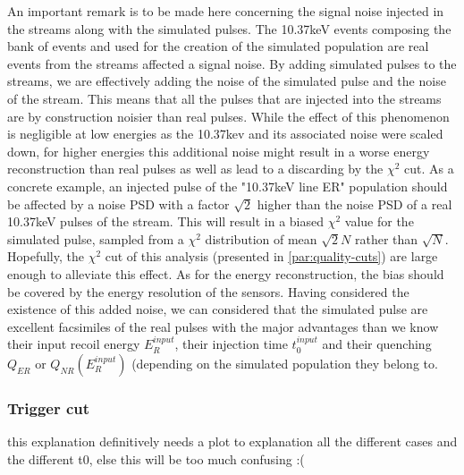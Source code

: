 An important remark is to be made here concerning the signal noise injected in the streams along with the simulated pulses. The 10.37keV events composing the bank of events and used for the creation of the simulated population are real events from the streams affected a signal noise. By adding simulated pulses to the streams, we are effectively adding the noise of the simulated pulse and the noise of the stream. This means that all the pulses that are injected into the streams are by construction noisier than real pulses.
While the effect of this phenomenon is negligible at low energies as the 10.37kev and its associated noise were scaled down, for higher energies this additional noise might result in a worse energy reconstruction than real pulses as well as lead to a discarding by the $\chi^2$ cut.
As a concrete example, an injected pulse of the "10.37keV line ER" population should be affected by a noise PSD with a factor $\sqrt{2}$ higher than the noise PSD of a real 10.37keV pulses of the stream. This will result in a biased $\chi^2$ value for the simulated pulse, sampled from a $\chi^2$ distribution of mean $\sqrt{2}N$ rather than $\sqrt{N}$. Hopefully, the $\chi^2$ cut of this analysis (presented in \ref{par:quality-cuts}) are large enough to alleviate this effect. As for the energy reconstruction, the bias should be covered by the energy resolution of the sensors.
Having considered the existence of this added noise, we can considered that the simulated pulse are excellent facsimiles of the real pulses with the major advantages than we know their input recoil energy $E_R^{input}$, their injection time $t_0^{input}$ and their quenching $Q_{ER}$ or $Q_{NR}(E_R^{input})$ (depending on the simulated population they belong to.



\subsubsection{Trigger cut}

{\color{red} this explanation definitively needs a plot to explanation all the different cases and the different t0, else this will be too much confusing :(}

